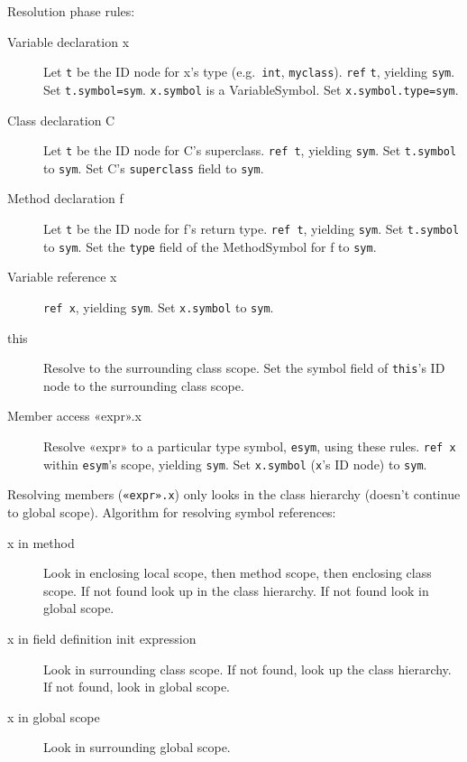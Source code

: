 Resolution phase rules:

\begin{description}
\item[Variable declaration x]
Let \verb=t= be the ID node for x's type (e.g.\ \verb=int=, \verb=myclass=).
\verb=ref= \verb=t=, yielding \verb=sym=.
Set \verb-t.symbol=sym-. \verb=x.symbol= is a VariableSymbol.
Set \verb+x.symbol.type=sym+.

\item[Class declaration C]
Let \verb=t= be the ID node for C's superclass.
\verb=ref t=, yielding \verb=sym=.
Set \verb=t.symbol= to \verb=sym=.
Set C's \verb=superclass= field to \verb=sym=.

\item[Method declaration f]
Let \verb=t= be the ID node for f's return type.
\verb=ref t=, yielding \verb=sym=.
Set \verb=t.symbol= to \verb=sym=.
Set the \verb=type= field of the MethodSymbol for f to \verb=sym=.

\item[Variable reference x]
\verb=ref x=, yielding \verb=sym=. Set \verb=x.symbol= to \verb=sym=.

\item[this]
Resolve to the surrounding class scope.
Set the symbol field of \verb=this='s ID node to the surrounding class scope.

\item[Member access «expr».x]
Resolve «expr» to a particular type symbol, \verb=esym=, using these rules.
\verb=ref x= within \verb=esym='s scope, yielding \verb=sym=.
Set \verb=x.symbol= (\verb=x='s ID node) to \verb=sym=.
\end{description}

Resolving members (\verb=«expr».x=) only looks in the class hierarchy
(doesn't continue to global scope).
Algorithm for resolving symbol references:

\begin{description}
\item[x in method]
Look in enclosing local scope, then method scope, then enclosing class scope.
If not found look up in the class hierarchy.
If not found look in global scope.

\item[x in field definition init expression]
Look in surrounding class scope.
If not found, look up the class hierarchy.
If not found, look in global scope.

\item[x in global scope]
Look in surrounding global scope.
\end{description}


